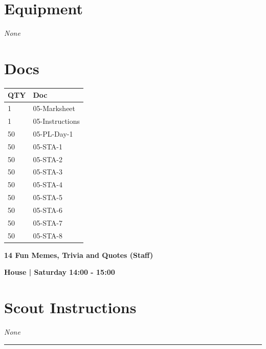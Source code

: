 \documentclass[10pt]{article}
\newcommand{\newtitle}[1]{\begin{center}{\Huge\bfseries #1 }\\ \vspace{5mm}\end{center}}
\newcommand{\newsubtitle}[1]{\begin{center}{\color{grey}\Large\bfseries #1 }\\ \vspace{5mm}\end{center}}
\begin{document}
	\begin{multicols}{2}

		\section*{\faWrench \: Equipment}

				\textit{None}
		
		\vfill\null
		\columnbreak

			\section*{\faFile \: Docs}
		 	\begin{center}
			\begin{tabular}{p{2cm}p{4cm}}

			\textbf{QTY} & \textbf{Doc} \\\toprule
										1&05-Marksheet\\\midrule
										1&05-Instructions\\\midrule
										50&05-PL-Day-1\\\midrule
										50&05-STA-1\\\midrule
										50&05-STA-2\\\midrule
										50&05-STA-3\\\midrule
										50&05-STA-4\\\midrule
										50&05-STA-5\\\midrule
										50&05-STA-6\\\midrule
										50&05-STA-7\\\midrule
										50&05-STA-8\\\midrule
							\end{tabular}
			\end{center}
	

		\vfill\null

		\end{multicols}



	\vspace{1cm}


	\clearpage
		\newtitle{14 Fun Memes, Trivia and Quotes (Staff) }
	\newsubtitle{House | Saturday 14:00 - 15:00}
		\setcounter{section}{13}
	\section*{Scout Instructions}
		\textit{None}
	
	\vspace{0.5cm}
	\hrule
	\vspace{0.5cm}
\end{document}
